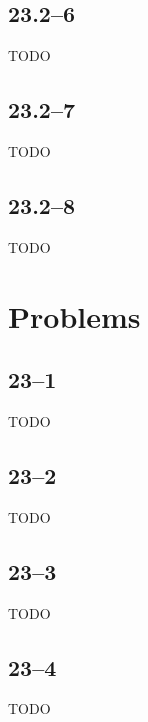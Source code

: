 \documentclass{article}
\begin{document}
\subsection*{23.2--6}
TODO

\subsection*{23.2--7}
TODO

\subsection*{23.2--8}
TODO

\section*{Problems}
\subsection*{23--1}
TODO

\subsection*{23--2}
TODO

\subsection*{23--3}
TODO

\subsection*{23--4}
TODO
\end{document}
